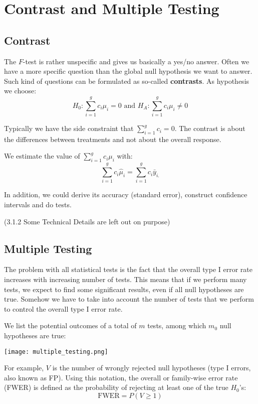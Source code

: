 \section{Contrast and Multiple Testing}

\subsection{Contrast}

The $F$-test is rather unspecific and gives us basically a yes/no answer. Often we have a more specific question than the global null hypothesis we want to answer. Such kind of questions can be formulated as so-called \textbf{contrasts}. As hypothesis we choose:
$$H_0 : \sum_{i=1}^g c_i \mu_i = 0 \text{ and } H_A : \sum_{i=1}^g c_i \mu_i \neq 0$$

Typically we have the side constraint that $\sum_{i=1}^g c_i = 0$. The contrast is about the differences between treatments and not about the overall response.

We estimate the value of $\sum_{i=1}^g c_i \mu_i$ with:
$$\sum_{i=1}^g c_i \hat \mu_i = \sum_{i=1}^g c_i \bar y_{i.}$$

In addition, we could derive its accuracy (standard error), construct confidence intervals and do tests. \medskip

(3.1.2 Some Technical Details are left out on purpose)

\subsection{Multiple Testing}

The problem with all statistical tests is the fact that the overall type I error rate increases with increasing number of tests. This means that if we perform many tests, we expect to find some significant results, even if all null hypotheses are true. Somehow we have to take into account the number of tests that we perform to control the overall type I error rate. \medskip

We list the potential outcomes of a total of $m$ tests, among which $m_0$ null hypotheses are true:
\begin{center}
	\texttt{[image: multiple\_testing.png]}
\end{center}

For example, $V$ is the number of wrongly rejected null hypotheses (type I errors, also known as FP). Using this notation, the overall or family-wise error rate (FWER) is defined as the probability of rejecting at least one of the true $H_0$'s:
$$\text{FWER} = P(V \geq 1)$$

